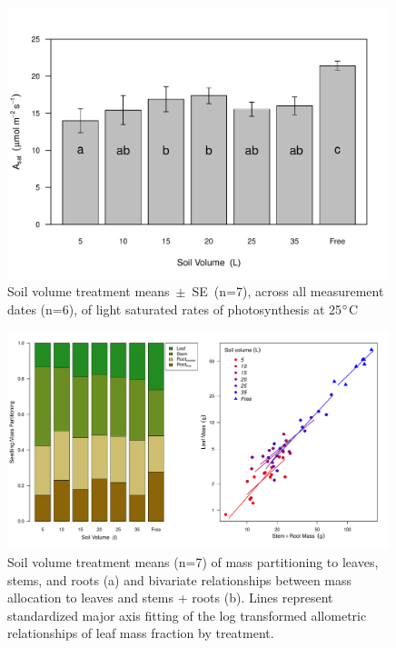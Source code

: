 \documentclass[a4paper]{article}\usepackage[]{graphicx}\usepackage[]{color}
\begin{document}
\begin{figure}[h!]
    \centering
    \includegraphics[width=0.99\textwidth]{Asat.pdf}
    \caption{Soil volume treatment means~$\pm$~SE~(n=7), across all measurement dates (n=6), of light saturated rates of photosynthesis at 25$\degree$C}
    \label{fig:figure3}
\end{figure}

\begin{figure}[h!]
    \centering
    \includegraphics[width=0.99\textwidth]{massfractions.pdf}
    \caption{Soil volume treatment means (n=7) of mass partitioning to leaves, stems, and roots (a) and bivariate relationships between mass allocation to leaves and stems + roots (b). Lines represent standardized major axis fitting of the log transformed allometric relationships of leaf mass fraction by treatment.}
    \label{fig:figure4}
\end{figure}
\end{document}
